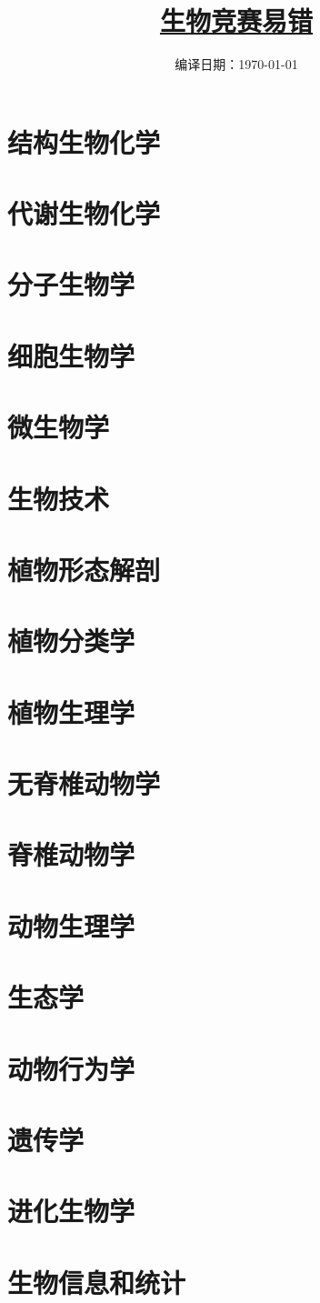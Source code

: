 \documentclass[b5paper,zihao=-4]{ctexbook}
\title{\fontsize{40}{40} \hyperref[mulu]{\textbf{生物竞赛易错}}}
\date{编译日期：\today}
\author{}
\begin{document}
	\frontmatter
	\maketitle
	\tableofcontents
	\label{mulu}

	\mainmatter
	\section{结构生物化学}
	\section{代谢生物化学}
	\section{分子生物学}
	\section{细胞生物学}
	\section{微生物学}
	\section{生物技术}

	\section{植物形态解剖}
	\section{植物分类学}
	\section{植物生理学}

	\section{无脊椎动物学}
	\section{脊椎动物学}
	\section{动物生理学}
	\section{生态学}
	\section{动物行为学}

	\section{遗传学}
	\section{进化生物学}
	\section{生物信息和统计}
\end{document}
